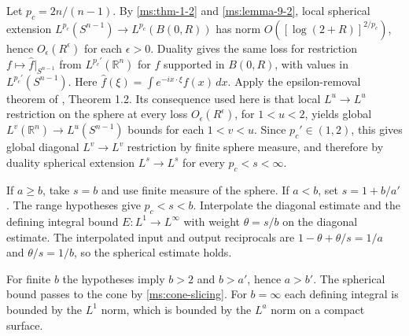 Let \(p_c=2n/(n-1)\). By \ref{ms:thm-1-2} and \ref{ms:lemma-9-2}, local spherical extension \(L^{p_c}(S^{n-1})\to L^{p_c}(B(0,R))\) has norm \(O([\log(2+R)]^{2/p_c})\), hence \(O_\epsilon(R^\epsilon)\) for each \(\epsilon>0\). Duality gives the same loss for restriction \(f\mapsto\widehat f|_{S^{n-1}}\) from \(L^{p_c'}(\mathbb R^n)\) for \(f\) supported in \(B(0,R)\), with values in \(L^{p_c'}(S^{n-1})\). Here \(\widehat f(\xi)=\int e^{-ix\cdot\xi}f(x)\,dx\). Apply the epsilon-removal theorem of \cite{r-75}, Theorem 1.2. Its consequence used here is that local \(L^u\to L^u\) restriction on the sphere at every loss \(O_\epsilon(R^\epsilon)\), for \(1<u<2\), yields global \(L^v(\mathbb R^n)\to L^u(S^{n-1})\) bounds for each \(1<v<u\). Since \(p_c'\in(1,2)\), this gives global diagonal \(L^v\to L^v\) restriction by finite sphere measure, and therefore by duality spherical extension \(L^s\to L^s\) for every \(p_c<s<\infty\).

If \(a\ge b\), take \(s=b\) and use finite measure of the sphere. If \(a<b\), set \(s=1+b/a'\). The range hypotheses give \(p_c<s<b\). Interpolate the diagonal estimate and the defining integral bound \(E:L^1\to L^\infty\) with weight \(\theta=s/b\) on the diagonal estimate. The interpolated input and output reciprocals are \(1-\theta+\theta/s=1/a\) and \(\theta/s=1/b\), so the spherical estimate holds.

For finite \(b\) the hypotheses imply \(b>2\) and \(b>a'\), hence \(a>b'\). The spherical bound passes to the cone by \ref{ms:cone-slicing}. For \(b=\infty\) each defining integral is bounded by the \(L^1\) norm, which is bounded by the \(L^a\) norm on a compact surface.
